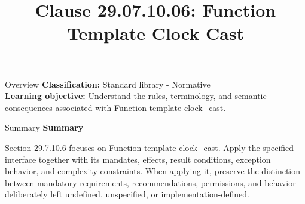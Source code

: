 \documentclass[10pt,letterpaper]{article}
\title{Clause 29.07.10.06: Function Template Clock Cast}
\author{}
\date{}
\begin{document}
\maketitle
\begin{CornellOverviewBox}{Overview}
\textbf{Classification:} Standard library - Normative\\[2pt]
\textbf{Learning objective:} Understand the rules, terminology, and semantic consequences associated with Function template clock\_cast.
\end{CornellOverviewBox}\begin{CornellSummaryBox}{Summary}
{\sffamily\bfseries\color{Accent} Summary}\par\vspace{3pt}Section 29.7.10.6 focuses on Function template clock\_cast. Apply the specified interface together with its mandates, effects, result conditions, exception behavior, and complexity constraints. When applying it, preserve the distinction between mandatory requirements, recommendations, permissions, and behavior deliberately left undefined, unspecified, or implementation-defined.
\end{CornellSummaryBox}
\end{document}
